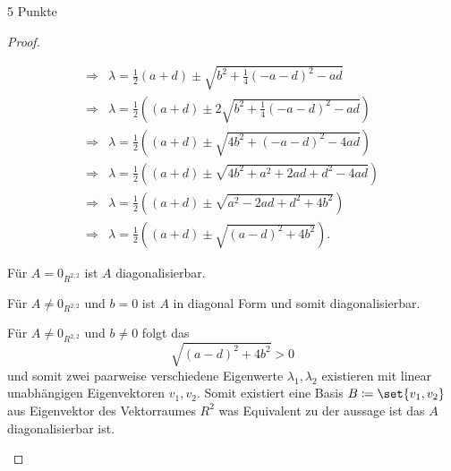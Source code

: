 \documentclass{problemset}
\begin{document}
\begin{problem}{5 Punkte}
\begin{proof}
\begin{enumerate}
\begin{align*}
                  \Rightarrow & \lambda  = \frac{1}{2}(a + d) \pm \sqrt{b^2 + \frac{1}{4}{(-a - d)}^2 - ad}                 \\
                  \Rightarrow & \lambda  = \frac{1}{2}((a + d) \pm 2\sqrt{b^2 + \frac{1}{4}{(-a - d)}^2 - ad})              \\
                  \Rightarrow & \lambda  = \frac{1}{2}\left((a + d) \pm \sqrt{4b^2 + {(-a - d)}^2 - 4ad}\right)             \\
                  \Rightarrow & \lambda  = \frac{1}{2}\left((a + d) \pm \sqrt{4b^2 + a^2 + 2ad + d^2 - 4ad}\right)          \\
                  \Rightarrow & \lambda  = \frac{1}{2}\left((a + d) \pm \sqrt{a^2 - 2ad + d^2 + 4b^2}\right)                \\
                  \Rightarrow & \lambda  = \frac{1}{2}\left((a + d) \pm \sqrt{{(a - d)}^2 + 4b^2}\right).
              \end{align*}

              Für \(A = 0_{R^{2,2}}\) ist \(A\) diagonalisierbar.

              Für \(A \neq 0_{R^{2,2}}\) und \(b = 0\) ist \(A\) in diagonal
              Form und somit diagonalisierbar.

              Für \(A \neq 0_{R^{2,2}}\) und \(b \neq 0\) folgt das
              \begin{equation*}
                  \sqrt{{(a - d)}^2 + 4b^2} > 0
              \end{equation*}
              und somit zwei paarweise verschiedene Eigenwerte \(\lambda_1,
              \lambda_2\) existieren mit linear unabhängigen Eigenvektoren
              \(v_1, v_2\). Somit existiert eine Basis \(B \coloneq \set{v_1, v_2}\)
              aus Eigenvektor des Vektorraumes \(R^2\) was Equivalent zu der
              aussage ist das \(A\) diagonalisierbar ist.


\end{enumerate}
\end{proof}
\end{problem}
\end{document}
